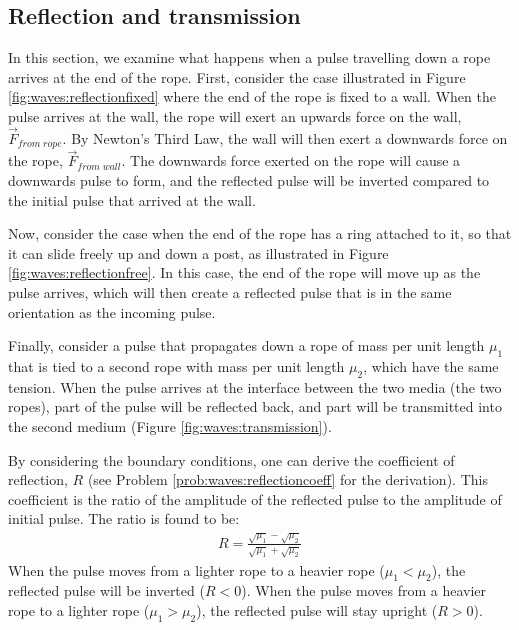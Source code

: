 \subsection{\label{subsec:waves:reflection}Reflection and transmission}
In this section, we examine what happens when a pulse travelling down a rope arrives at the end of the rope. First, consider the case illustrated in Figure \ref{fig:waves:reflectionfixed} where the end of the rope is fixed to a wall.
When the pulse arrives at the wall, the rope will exert an upwards force on the wall, $\vec F_{from\; rope}$. By Newton's Third Law, the wall will then exert a downwards force on the rope, $\vec F_{from\; wall}$. The downwards force exerted on the rope will cause a downwards pulse to form, and the reflected pulse will be inverted compared to the initial pulse that arrived at the wall.

Now, consider the case when the end of the rope has a ring attached to it, so that it can slide freely up and down a post, as illustrated in Figure \ref{fig:waves:reflectionfree}.
In this case, the end of the rope will move up as the pulse arrives, which will then create a reflected pulse that is in the same orientation as the incoming pulse.

Finally, consider a pulse that propagates down a rope of mass per unit length $\mu_1$ that is tied to a second rope with mass per unit length $\mu_2$, which have the same tension. When the pulse arrives at the interface between the two media (the two ropes), part of the pulse will be reflected back, and part will be transmitted into the second medium (Figure \ref{fig:waves:transmission}). 


By considering the boundary conditions, one can derive the coefficient of reflection, $R$ (see Problem \ref{prob:waves:reflectioncoeff} for the derivation). This coefficient is the ratio of the amplitude of the reflected pulse to the amplitude of initial pulse. The ratio is found to be:
\begin{align*}
R=\frac{\sqrt{\mu_1}-\sqrt{\mu_2}}{\sqrt{\mu_1}+\sqrt{\mu_2}}
\end{align*}
When the pulse moves from a lighter rope to a heavier rope ($\mu_1<\mu_2$), the reflected pulse will be inverted ($R<0$). When the pulse moves from a heavier rope to a lighter rope ($\mu_1>\mu_2$), the reflected pulse will stay upright ($R>0$). 

